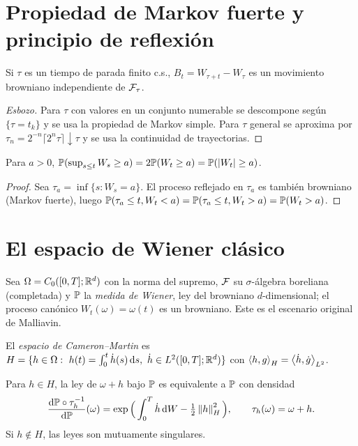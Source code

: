 \section{Propiedad de Markov fuerte y principio de reflexión}

\begin{teorema}
Si $\tau$ es un tiempo de parada finito c.s., $B_t=W_{\tau+t}-W_\tau$ es
un movimiento browniano independiente de $\F_\tau$.
\end{teorema}

\begin{proof}[Esbozo]
Para $\tau$ con valores en un conjunto numerable se descompone según $\{\tau=t_k\}$ y se usa
la propiedad de Markov simple. Para $\tau$ general se aproxima por $\tau_n=2^{-n}\lceil2^n\tau\rceil\downarrow\tau$ y se usa la
continuidad de trayectorias.
\end{proof}

\begin{corolario}
Para $a>0$, $\P(\sup_{s\le t}W_s\ge a)=2\P(W_t\ge a)=
\P(\abs{W_t}\ge a)$.
\end{corolario}

\begin{proof}
Sea $\tau_a=\inf\{s:W_s=a\}$. El proceso reflejado en $\tau_a$ es también browniano
(Markov fuerte), luego $\P(\tau_a\le t,W_t<a)=\P(\tau_a\le t,W_t>a)=\P(W_t>a)$.
\end{proof}

\section{El espacio de Wiener clásico}
Sea $\Omega=C_0([0,T];\R^d)$ con la norma del supremo, $\F$ su $\sigma$-álgebra boreliana (completada) y $\P$ la
\emph{medida de Wiener}, ley del browniano $d$-dimensional; el proceso canónico $W_t(\omega)=\omega(t)$ es un
browniano. Este es el escenario original de Malliavin.

\begin{definicion}
El \emph{espacio de Cameron--Martin} es $H=\{h\in\Omega:\ h(t)=\int_0^t\dot h(s)\,\dd s,\ \dot h\in
L^2([0,T];\R^d)\}$ con $\ip{h}{g}_H=\ip{\dot h}{\dot g}_{L^2}$.
\end{definicion}

\begin{teorema}\label{teo:cameron-martin}
Para $h\in H$, la ley de $\omega+h$ bajo $\P$ es equivalente a $\P$
con densidad
\[
  \frac{\dd\P\circ\tau_h^{-1}}{\dd\P}(\omega)=\exp\Big(\int_0^T\dot h\,\dd W-\tfrac12\norm{h}_H^2\Big),\qquad\tau_h(\omega)=\omega+h.
\]
Si $h\notin H$, las leyes son mutuamente singulares.
\end{teorema}

